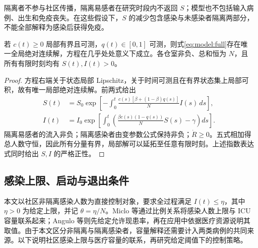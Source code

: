 \documentclass[lang=cn,a4paper,newtx]{elegantpaper}
\numberwithin{equation}{section}
\theoremstyle{plain}
\begin{document}
隔离者不参与社区传播，隔离易感者在研究时段内不返回 $S$；模型也不包括输入病例、出生和免疫丧失。在这些假设下，$S$ 的减少包含感染与未感染者隔离两部分，不能全部解释为感染后获得免疫。

\begin{proposition}
\label{prop:model:positive}
若 $c(t)\ge0$ 局部有界且可测，$q(t)\in[0,1]$ 可测，则式\eqref{eq:model:full}存在唯一全局绝对连续解，方程在几乎处处意义下成立。各仓室非负、总和恒为 $N$，且所有有限时刻均有 $S(t),I(t)>0$。
\end{proposition}
\begin{proof}
方程右端关于状态局部 Lipschitz，关于时间可测且在有界状态集上局部可积，故有唯一局部绝对连续解。前两式给出
\begin{align*}
S(t)&=S_0\exp\!\left[-\int_0^t\frac{c(s)[\beta+(1-\beta)q(s)]}{N}I(s)\,ds\right],\\
I(t)&=I_0\exp\!\left[\int_0^t\left(\frac{\beta c(s)(1-q(s))}{N}S(s)-\gamma\right)ds\right].
\end{align*}
隔离易感者的流入非负；隔离感染者由变参数公式保持非负；$\dot R\ge0$。五式相加得总人数守恒，因此所有分量有界，局部解可以延拓至任意有限时刻。上述指数表达式同时给出 $S,I$ 的严格正性。
\end{proof}

\subsection{感染上限、启动与退出条件}
\label{sec:model:strategy}
本文以社区非隔离感染人数为直接控制对象，要求全过程满足 $I(t)\le\eta$，其中 $\eta>0$ 为给定上限，并记 $\theta=\eta/N$。Miclo 等\cite{Miclo2022ICU}通过比例关系将感染人数上限与 ICU 容量联系起来；Angulo 等\cite{Angulo2021}则先给定允许现患率，再在应用中依据医疗资源说明其取值。由于本文区分非隔离与隔离感染者，容量解释还需要计入两类病例的共同来源。以下说明社区感染上限与医疗容量的联系，再研究给定阈值下的控制策略。
\end{document}
